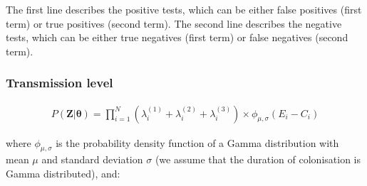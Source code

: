 \documentclass[10pt]{article}
\begin{document}
The first line describes the positive tests, which can be either false positives (first term) or true positives (second term). 
The second line describes the negative tests, which can be either true negatives (first term) or false negatives (second term). 


\subsubsection*{Transmission level} 


\begin{eqnarray*}
P\left(\bm{Z}|\bm{\theta}\right) = 
\bm{\prod}_{i=1}^N %
\left( \lambda_i^{\left(1\right)} + \lambda_i^{\left(2\right)} + \lambda_i^{\left(3\right)} \right) \times \phi_{\mu,\sigma}\left(E_i-C_i\right)
\end{eqnarray*}

\noindent where $\phi_{\mu,\sigma}$ is the probability density function of a Gamma distribution with mean $\mu$ and standard deviation $\sigma$ (we assume that the duration of colonisation is Gamma distributed), and: 
\end{document}

